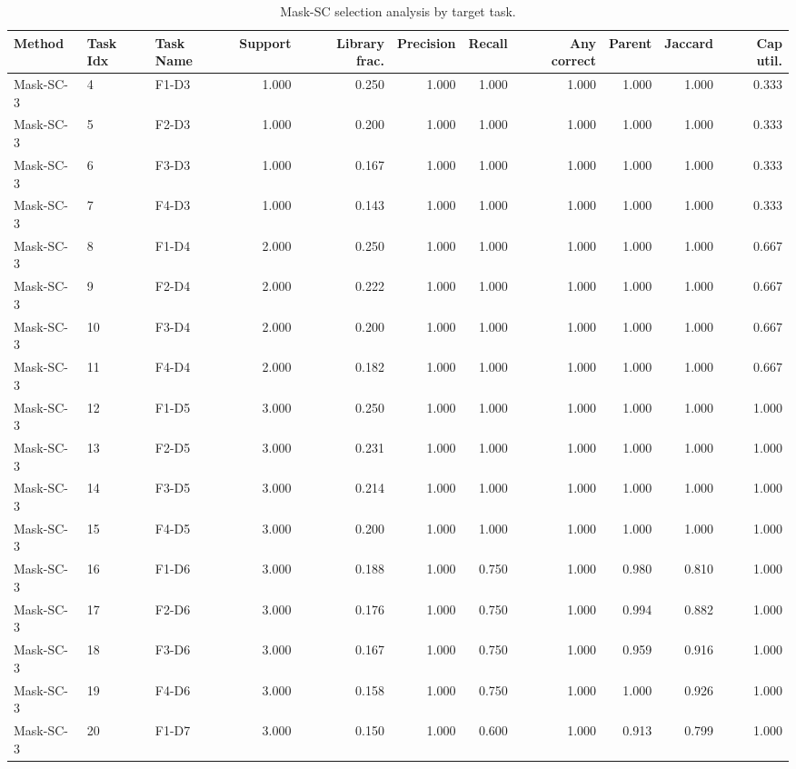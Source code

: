 \begin{table}[ht]
    \caption{Mask-SC selection analysis by target task.}
    \label{tbl:masksc_selection_task}
    \centering
    \scriptsize
    \begin{tabular}{lllrrrrrrrr}
    \toprule
Method & Task Idx & Task Name & Support & Library frac. & Precision & Recall & Any correct & Parent & Jaccard & Cap util. \\
    \midrule
Mask-SC-3 & 4 & F1-D3 & 1.000 & 0.250 & 1.000 & 1.000 & 1.000 & 1.000 & 1.000 & 0.333 \\
Mask-SC-3 & 5 & F2-D3 & 1.000 & 0.200 & 1.000 & 1.000 & 1.000 & 1.000 & 1.000 & 0.333 \\
Mask-SC-3 & 6 & F3-D3 & 1.000 & 0.167 & 1.000 & 1.000 & 1.000 & 1.000 & 1.000 & 0.333 \\
Mask-SC-3 & 7 & F4-D3 & 1.000 & 0.143 & 1.000 & 1.000 & 1.000 & 1.000 & 1.000 & 0.333 \\
Mask-SC-3 & 8 & F1-D4 & 2.000 & 0.250 & 1.000 & 1.000 & 1.000 & 1.000 & 1.000 & 0.667 \\
Mask-SC-3 & 9 & F2-D4 & 2.000 & 0.222 & 1.000 & 1.000 & 1.000 & 1.000 & 1.000 & 0.667 \\
Mask-SC-3 & 10 & F3-D4 & 2.000 & 0.200 & 1.000 & 1.000 & 1.000 & 1.000 & 1.000 & 0.667 \\
Mask-SC-3 & 11 & F4-D4 & 2.000 & 0.182 & 1.000 & 1.000 & 1.000 & 1.000 & 1.000 & 0.667 \\
Mask-SC-3 & 12 & F1-D5 & 3.000 & 0.250 & 1.000 & 1.000 & 1.000 & 1.000 & 1.000 & 1.000 \\
Mask-SC-3 & 13 & F2-D5 & 3.000 & 0.231 & 1.000 & 1.000 & 1.000 & 1.000 & 1.000 & 1.000 \\
Mask-SC-3 & 14 & F3-D5 & 3.000 & 0.214 & 1.000 & 1.000 & 1.000 & 1.000 & 1.000 & 1.000 \\
Mask-SC-3 & 15 & F4-D5 & 3.000 & 0.200 & 1.000 & 1.000 & 1.000 & 1.000 & 1.000 & 1.000 \\
Mask-SC-3 & 16 & F1-D6 & 3.000 & 0.188 & 1.000 & 0.750 & 1.000 & 0.980 & 0.810 & 1.000 \\
Mask-SC-3 & 17 & F2-D6 & 3.000 & 0.176 & 1.000 & 0.750 & 1.000 & 0.994 & 0.882 & 1.000 \\
Mask-SC-3 & 18 & F3-D6 & 3.000 & 0.167 & 1.000 & 0.750 & 1.000 & 0.959 & 0.916 & 1.000 \\
Mask-SC-3 & 19 & F4-D6 & 3.000 & 0.158 & 1.000 & 0.750 & 1.000 & 1.000 & 0.926 & 1.000 \\
Mask-SC-3 & 20 & F1-D7 & 3.000 & 0.150 & 1.000 & 0.600 & 1.000 & 0.913 & 0.799 & 1.000 \\

\end{tabular}
\end{table}
